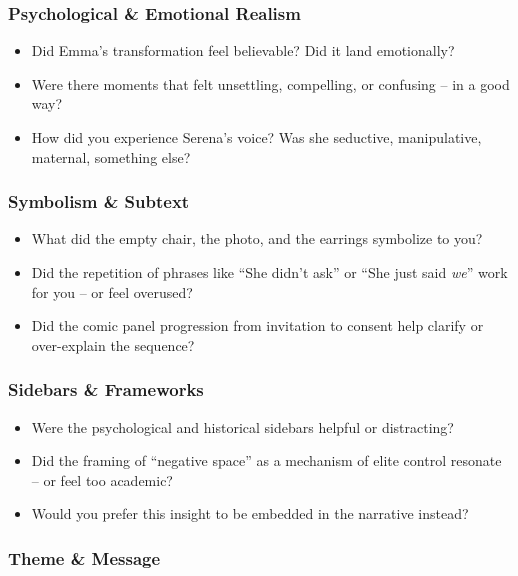 \subsubsection{Psychological \& Emotional Realism}

\begin{itemize}
  \item Did Emma’s transformation feel believable? Did it land emotionally?
  \item Were there moments that felt unsettling, compelling, or confusing -- in a good way?
  \item How did you experience Serena’s voice? Was she seductive, manipulative, maternal, something else?
\end{itemize}

\subsubsection{Symbolism \& Subtext}

\begin{itemize}
  \item What did the empty chair, the photo, and the earrings symbolize to you?
  \item Did the repetition of phrases like ``She didn’t ask'' or ``She just said \textit{we}'' work for you -- or feel overused?
  \item Did the comic panel progression from invitation to consent help clarify or over-explain the sequence?
\end{itemize}

\subsubsection{Sidebars \& Frameworks}

\begin{itemize}
  \item Were the psychological and historical sidebars helpful or distracting?
  \item Did the framing of ``negative space'' as a mechanism of elite control resonate -- or feel too academic?
  \item Would you prefer this insight to be embedded in the narrative instead?
\end{itemize}

\subsubsection{Theme \& Message}

